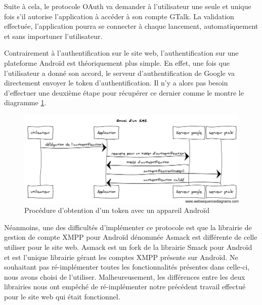  
Suite à cela, le protocole OAuth va demander à l'utilisateur une seule et unique fois s'il autorise 
l'application à accéder à son compte GTalk. La validation effectuée, l'application pourra se connecter 
à chaque lancement, automatiquement et sans importuner l'utilisateur. 
 
 
Contrairement à l'authentification sur le site web, l'authentification sur une plateforme Androïd est
théoriquement plus simple. En effet, une fois que l'utilisateur a donné son accord, le serveur 
d'authentification de Google va directement envoyer le token d'authentification. Il n'y a alors pas 
besoin d'effectuer une deuxième étape pour récupérer ce dernier comme le montre le diagramme 
\ref{obtention-token-avec-android}.
 
 
 
\begin{figure}[!h]
  \center
  \includegraphics[width=15cm]{img/obtention-token-avec-android.png}
  \caption{Procédure d'obtention d'un token avec un appareil Androïd}
  \label{obtention-token-avec-android}
\end{figure}
 
Néanmoins, une des difficultés d'implémenter ce protocole est que la librairie de gestion de compte
XMPP pour Androïd dénommée Asmack est différente de celle utiliser pour le site web. Asmack est un fork 
de la librairie Smack pour Androïd et est l'unique librairie gérant les comptes XMPP présente sur
Androïd. Ne souhaitant pas ré-implémenter toutes les fonctionnalités présentes dans celle-ci, nous avons
choisi de l'utiliser. Malheureusement, les différences entre les deux librairies nous ont empêché de 
ré-implémenter notre précédent travail effectué pour le site web qui était fonctionnel. 
 
